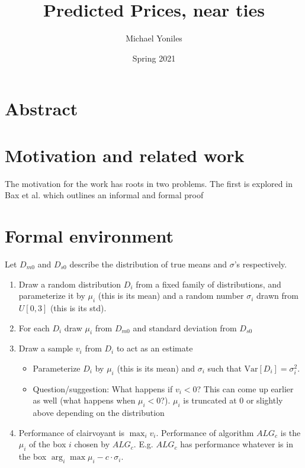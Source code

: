 \documentclass[11pt]{article}
\title{Predicted Prices, near ties}
\author{Michael Yoniles}
\date{Spring 2021}
\begin{document}
\maketitle

\begin{multicols}{2}
\section{Abstract}
\section{Motivation and related work}

The motivation for the work has roots in two problems.
The first is explored in Bax et al. which outlines an informal and formal proof

\section{Formal environment}

Let $D_{m0}$ and $D_{s0}$ describe the distribution of true means and $\sigma$'s respectively.

\begin{enumerate}
    \item Draw a random distribution $D_i$ from a fixed family of distributions, and parameterize it by $\mu_i$ (this is its mean) and a random number $\sigma_i$ drawn from $U[0,3]$ (this is its std).
    \item For each $D_i$ draw $\mu_i$ from $D_{m0}$ and standard deviation from $D_{s0}$%
    \item Draw a sample $v_i$ from $D_i$ to act as an estimate \begin{itemize}
    \item Parameterize $D_i$ by $\mu_i$ (this is its mean) and $\sigma_i$ such that $\mathrm{Var}[D_i] = \sigma_i^2$.
        \item Question/suggestion: What happens if $v_i < 0$? This can come up earlier as well (what happens when $\mu_i < 0$?). {\color{red}$\mu_i$ is truncated at 0 or slightly above depending on the distribution}
        \end{itemize}
    \item Performance of clairvoyant is $\max_i v_i$. Performance of algorithm $ALG_c$ is the $\mu_i$ of the box $i$ chosen by $ALG_c$. E.g. $ALG_c$ has performance whatever is in the box $\arg_i\max \mu_i - c \cdot \sigma_i$.
\end{enumerate}


\end{multicols}
\end{document}
